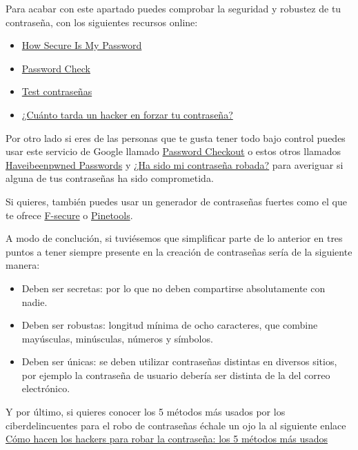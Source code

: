 \documentclass[
  a4paper,
  openany]{book}
\begin{document}
Para acabar con este apartado puedes comprobar la seguridad y robustez de tu contraseña, con los siguientes recursos online:

\begin{itemize}
\item
  \href{https://www.security.org/how-secure-is-my-password/}{How Secure Is My Password}
\item
  \href{https://password.kaspersky.com/}{Password Check}
\item
  \href{https://www.ontek.net/test-contrasenas/}{Test contraseñas}
\item
  \href{https://www.hivesystems.io/blog/are-your-passwords-in-the-green}{¿Cuánto tarda un hacker en forzar tu contraseña?}
\end{itemize}

Por otro lado si eres de las personas que te gusta tener todo bajo control puedes usar este servicio de Google llamado \href{https://www.blog.google/technology/safety-security/google-password-checkup-cross-account-protection/}{Password Checkout} o estos otros llamados \href{https://haveibeenpwned.com/Passwords}{Haveibeenpwned Passwords} y \href{https://www.avast.com/hackcheck}{¿Ha sido mi contraseña robada?} para averiguar si alguna de tus contraseñas ha sido comprometida.

Si quieres, también puedes usar un generador de contraseñas fuertes como el que te ofrece \href{https://www.f-secure.com/en/home/free-tools/password-generator}{F-secure} o \href{https://pinetools.com/es/generador-contrasenas}{Pinetools}.

A modo de conclución, si tuviésemos que simplificar parte de lo anterior en tres puntos a tener siempre presente en la creación de contraseñas sería de la siguiente manera:

\begin{itemize}
\item
  Deben ser secretas: por lo que no deben compartirse absolutamente con nadie.
\item
  Deben ser robustas: longitud mínima de ocho caracteres, que combine mayúsculas, minúsculas, números y símbolos.
\item
  Deben ser únicas: se deben utilizar contraseñas distintas en diversos sitios, por ejemplo la contraseña de usuario debería ser distinta de la del correo electrónico.
\end{itemize}

Y por último, si quieres conocer los 5 métodos más usados por los ciberdelincuentes para el robo de contraseñas échale un ojo la al siguiente enlace \href{https://www.lavanguardia.com/andro4all/tecnologia/como-hacen-los-hackers-para-robar-la-contrasena-los-5-metodos-mas-usados}{Cómo hacen los hackers para robar la contraseña: los 5 métodos más usados}
\end{document}
